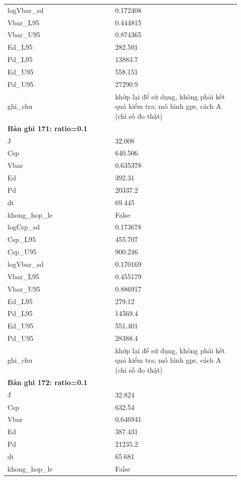 \begin{longtable}{p{0.43\linewidth}p{0.50\linewidth}}
logVbar\_\allowbreak sd & 0.172408 \\
Vbar\_\allowbreak L95 & 0.444815 \\
Vbar\_\allowbreak U95 & 0.874365 \\
Ed\_\allowbreak L95 & 282.501 \\
Pd\_\allowbreak L95 & 13883.7 \\
Ed\_\allowbreak U95 & 558.151 \\
Pd\_\allowbreak U95 & 27290.9 \\
ghi\_\allowbreak chu & khớp lại để sử dụng, không phải kết quả kiểm tra; mô hình gpr, cách A (chỉ số đo thật) \\
\midrule
\multicolumn{2}{p{0.95\linewidth}}{\textbf{Bản ghi 171: ratio=0.1}} \\
J & 32.008 \\
Csp & 640.506 \\
Vbar & 0.635378 \\
Ed & 392.31 \\
Pd & 20337.2 \\
dt & 69.445 \\
khong\_\allowbreak hop\_\allowbreak le & False \\
logCsp\_\allowbreak sd & 0.173678 \\
Csp\_\allowbreak L95 & 455.707 \\
Csp\_\allowbreak U95 & 900.246 \\
logVbar\_\allowbreak sd & 0.170169 \\
Vbar\_\allowbreak L95 & 0.455179 \\
Vbar\_\allowbreak U95 & 0.886917 \\
Ed\_\allowbreak L95 & 279.12 \\
Pd\_\allowbreak L95 & 14569.4 \\
Ed\_\allowbreak U95 & 551.401 \\
Pd\_\allowbreak U95 & 28388.4 \\
ghi\_\allowbreak chu & khớp lại để sử dụng, không phải kết quả kiểm tra; mô hình gpr, cách A (chỉ số đo thật) \\
\midrule
\multicolumn{2}{p{0.95\linewidth}}{\textbf{Bản ghi 172: ratio=0.1}} \\
J & 32.824 \\
Csp & 632.54 \\
Vbar & 0.646941 \\
Ed & 387.431 \\
Pd & 21235.2 \\
dt & 65.681 \\
khong\_\allowbreak hop\_\allowbreak le & False \\

\end{longtable}
